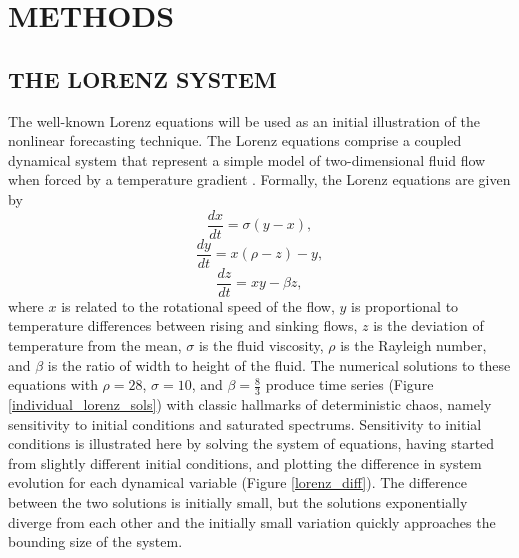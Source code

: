 \newpage

\section{METHODS}
\subsection{THE LORENZ SYSTEM}

The well-known Lorenz equations will be used as an initial illustration of the nonlinear forecasting technique.  The Lorenz equations comprise a coupled dynamical system that represent a simple model of two-dimensional fluid flow when forced by a temperature gradient \cite{lorenz_equations}. Formally, the Lorenz equations are given by
$$ \frac{dx}{dt} = \sigma(y-x), $$
$$\frac{dy}{dt} = x( \rho - z ) - y, $$
$$\frac{dz}{dt} = xy - \beta z,$$
where $x$ is related to the rotational speed of the flow, $y$ is proportional to temperature differences between  rising and sinking flows, $z$ is the deviation of temperature from the mean, $\sigma$ is the fluid viscosity, $\rho$ is the Rayleigh number, and $\beta$ is the ratio of width to height of the fluid. The numerical solutions to these equations with $\rho=28$, $\sigma=10$, and $\beta=\frac{8}{3}$ produce time series  (Figure \ref{individual_lorenz_sols}) with classic hallmarks of deterministic chaos, namely sensitivity to initial conditions and saturated spectrums. Sensitivity to initial conditions is illustrated here by solving the system of equations, having started from slightly different initial conditions, and plotting the difference in system evolution for each dynamical variable (Figure \ref{lorenz_diff}). The difference between the two solutions is initially small, but the solutions exponentially diverge from each other and the initially small variation quickly approaches the bounding size of the system. 

